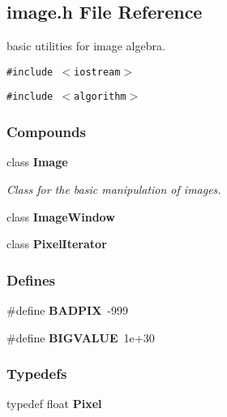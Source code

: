 \subsection{image.h File Reference}
\label{image_h}
basic utilities for image algebra. 


{\tt \#include $<$iostream$>$}\par
{\tt \#include $<$algorithm$>$}\par
\subsubsection*{Compounds}
\begin{CompactItemize}
\item 
class {\bf Image}
\begin{CompactList}\small\item\em Class for the basic manipulation of images.\item\end{CompactList}\item 
class {\bf Image\-Window}
\item 
class {\bf Pixel\-Iterator}
\end{CompactItemize}
\subsubsection*{Defines}
\begin{CompactItemize}
\item 
{}
\#define {\bf BADPIX}\ -999\label{image_h_a0}

\item 
{}
\#define {\bf BIGVALUE}\ 1e+30\label{image_h_a1}

\end{CompactItemize}
\subsubsection*{Typedefs}
\begin{CompactItemize}
\item 
{}
typedef float {\bf Pixel}\label{image_h_a2}

\end{CompactItemize}
